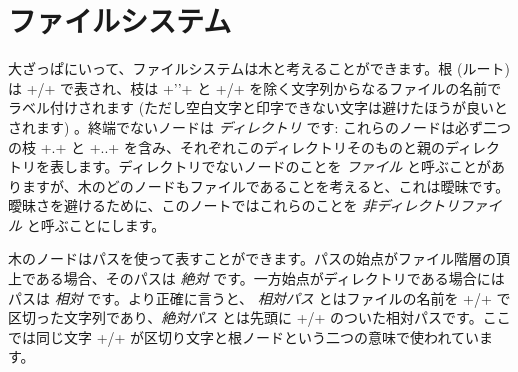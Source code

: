\section{ファイルシステム}

大ざっぱにいって、ファイルシステムは木と考えることができます。根 (ルート)は \ml+/+ で表され、枝は \ml+''+ と \ml+/+ を除く文字列からなるファイルの名前でラベル付けされます (ただし空白文字と印字できない文字は避けたほうが良いとされます) 。終端でないノードは \emph{ディレクトリ} です: これらのノードは必ず二つの枝 \ml+.+ と \ml+..+ を含み、それぞれこのディレクトリそのものと親のディレクトリを表します。ディレクトリでないノードのことを \emph{ファイル} と呼ぶことがありますが、木のどのノードもファイルであることを考えると、これは曖昧です。曖昧さを避けるために、このノートではこれらのことを \emph{非ディレクトリファイル} と呼ぶことにします。

木のノードはパスを使って表すことができます。パスの始点がファイル階層の頂上である場合、そのパスは \emph{絶対} です。一方始点がディレクトリである場合にはパスは \emph{相対} です。より正確に言うと、 \emph{相対パス} とはファイルの名前を \ml+/+ で区切った文字列であり、\emph{絶対パス} とは先頭に \ml+/+ のついた相対パスです。ここでは同じ文字 \ml+/+ が区切り文字と根ノードという二つの意味で使われています。

